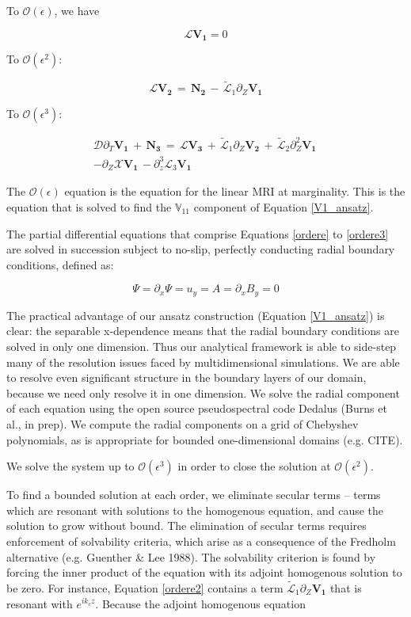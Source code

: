 \documentclass{emulateapj}
\newcommand{\beq}{\begin{equation}}
\newcommand{\eeq}{\end{equation}}
\begin{document}
To $\mathcal{O}(\epsilon)$, we have

\beq
\label{ordere}
\mathcal{L}\mathbf{V_1} = 0
\eeq

To $\mathcal{O}(\epsilon^2)$: 

\beq
\label{ordere2}
\mathcal{L}\mathbf{V_2} \, = \, \mathbf{N_2} \, - \, \widetilde{\mathcal{L}}_1 \partial_Z \mathbf{V_1}
\eeq

To $\mathcal{O}(\epsilon^3)$: 

\begin{multline}
\label{ordere3}
\mathcal{D}\partial_T \mathbf{V_1} \, + \, \mathbf{N_3} \, = \, \mathcal{L} \mathbf{V_3} \, + \, \widetilde{\mathcal{L}}_1\partial_Z\mathbf{V_2} \, + \, \widetilde{\mathcal{L}}_2\partial_Z^2\mathbf{V_1} \, \\
- \partial_Z\mathcal{X}\mathbf{V_1} \, - \partial_z^3\mathcal{L}_3\mathbf{V_1}
\end{multline}

The $\mathcal{O}(\epsilon)$ equation is the equation for the linear MRI at marginality. This is the equation that is solved to find the $\mathbb{V}_{11}$ component of Equation \ref{V1_ansatz}. 

The partial differential equations that comprise Equations \ref{ordere} to \ref{ordere3} are solved in succession subject to no-slip, perfectly conducting radial boundary conditions, defined as:

\beq
\Psi = \partial_x \Psi = u_y = A = \partial_x B_y = 0
\eeq

The practical advantage of our ansatz construction (Equation \ref{V1_ansatz}) is clear: the separable x-dependence means that the radial boundary conditions are solved in only one dimension. Thus our analytical framework is able to side-step many of the resolution issues faced by multidimensional simulations. We are able to resolve even significant structure in the boundary layers of our domain, because we need only resolve it in one dimension. We solve the radial component of each equation using the open source pseudospectral code Dedalus (Burns et al., in prep). We compute the radial components on a grid of Chebyshev polynomials, as is appropriate for bounded one-dimensional domains (e.g. CITE). 

We solve the system up to $\mathcal{O}(\epsilon^3)$ in order to close the solution at $\mathcal{O}(\epsilon^2)$. 

To find a bounded solution at each order, we eliminate secular terms -- terms which are resonant with solutions to the homogenous equation, and cause the solution to grow without bound. The elimination of secular terms requires enforcement of solvability criteria, which arise as a consequence of the Fredholm alternative (e.g. Guenther \& Lee 1988). The solvability criterion is found by forcing the inner product of the equation with its adjoint homogenous solution to be zero. For instance, Equation \ref{ordere2} contains a term $\widetilde{\mathcal{L}}_1 \partial_Z \mathbf{V_1}$ that is resonant with $e^{i k_c z}$. Because the adjoint homogenous equation
\end{document}

